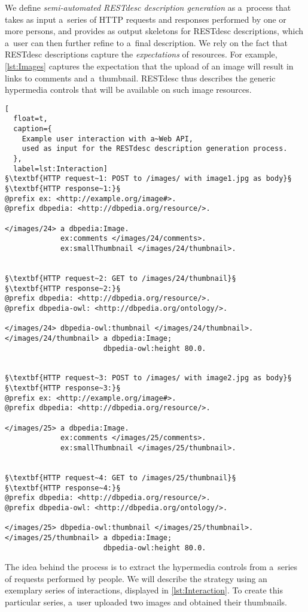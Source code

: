 We define \emph{semi-automated RESTdesc description generation}
as a~process that takes as input a~series of HTTP requests and responses
performed by one or more persons,
and provides as output skeletons for RESTdesc descriptions,
which a~user can then further refine to a~final description.
We rely on the fact that RESTdesc descriptions
capture the \emph{expectations} of resources.
For example, \cref{lst:Images} captures the expectation that
the upload of an image will result in links to comments and a~thumbnail.
RESTdesc thus describes the generic hypermedia controls
that will be available on such image resources.

\begin{lstlisting}[
  float=t,
  caption={
    Example user interaction with a~Web API,
    used as input for the RESTdesc description generation process.
  },
  label=lst:Interaction]
§\textbf{HTTP request~1: POST to /images/ with image1.jpg as body}§
§\textbf{HTTP response~1:}§
@prefix ex: <http://example.org/image#>.
@prefix dbpedia: <http://dbpedia.org/resource/>.

</images/24> a dbpedia:Image.
             ex:comments </images/24/comments>.
             ex:smallThumbnail </images/24/thumbnail>.


§\textbf{HTTP request~2: GET to /images/24/thumbnail}§
§\textbf{HTTP response~2:}§
@prefix dbpedia: <http://dbpedia.org/resource/>.
@prefix dbpedia-owl: <http://dbpedia.org/ontology/>.

</images/24> dbpedia-owl:thumbnail </images/24/thumbnail>.
</images/24/thumbnail> a dbpedia:Image;
                       dbpedia-owl:height 80.0.


§\textbf{HTTP request~3: POST to /images/ with image2.jpg as body}§
§\textbf{HTTP response~3:}§
@prefix ex: <http://example.org/image#>.
@prefix dbpedia: <http://dbpedia.org/resource/>.

</images/25> a dbpedia:Image.
             ex:comments </images/25/comments>.
             ex:smallThumbnail </images/25/thumbnail>.


§\textbf{HTTP request~4: GET to /images/25/thumbnail}§
§\textbf{HTTP response~4:}§
@prefix dbpedia: <http://dbpedia.org/resource/>.
@prefix dbpedia-owl: <http://dbpedia.org/ontology/>.

</images/25> dbpedia-owl:thumbnail </images/25/thumbnail>.
</images/25/thumbnail> a dbpedia:Image;
                       dbpedia-owl:height 80.0.
\end{lstlisting}

The idea behind the process is
to extract the hypermedia controls from a~series of requests performed by people.
We will describe the strategy using an exemplary series of interactions,
displayed in \cref{lst:Interaction}.
To create this particular series,
a~user uploaded two images and obtained their thumbnails.


